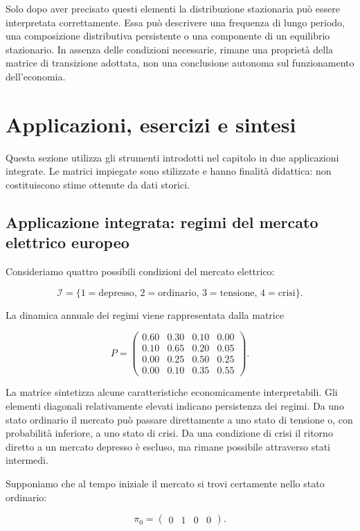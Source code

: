 Solo dopo aver precisato questi elementi la distribuzione stazionaria
pu\`{o} essere interpretata correttamente. Essa pu\`{o} descrivere una
frequenza di lungo periodo, una composizione distributiva persistente
o una componente di un equilibrio stazionario. In assenza delle
condizioni necessarie, rimane una propriet\`{a} della matrice di
transizione adottata, non una conclusione autonoma sul funzionamento
dell'economia.

\section{Applicazioni, esercizi e sintesi}

Questa sezione utilizza gli strumenti introdotti nel capitolo in due
applicazioni integrate. Le matrici impiegate sono stilizzate e hanno
finalit\`{a} didattica: non costituiscono stime ottenute da dati
storici.

\subsection{Applicazione integrata: regimi del mercato elettrico europeo}

Consideriamo quattro possibili condizioni del mercato elettrico:

\[
\mathcal{I}
=
\{
1=\text{depresso},
\,
2=\text{ordinario},
\,
3=\text{tensione},
\,
4=\text{crisi}
\}.
\]

La dinamica annuale dei regimi viene rappresentata dalla matrice

\[
P=
\begin{pmatrix}
0.60 & 0.30 & 0.10 & 0.00\\
0.10 & 0.65 & 0.20 & 0.05\\
0.00 & 0.25 & 0.50 & 0.25\\
0.00 & 0.10 & 0.35 & 0.55
\end{pmatrix}.
\]

La matrice sintetizza alcune caratteristiche economicamente
interpretabili. Gli elementi diagonali relativamente elevati indicano
persistenza dei regimi. Da uno stato ordinario il mercato pu\`{o}
passare direttamente a uno stato di tensione o, con probabilit\`{a}
inferiore, a uno stato di crisi. Da una condizione di crisi il ritorno
diretto a un mercato depresso \`{e} escluso, ma rimane possibile
attraverso stati intermedi.

Supponiamo che al tempo iniziale il mercato si trovi certamente nello
stato ordinario:

\[
\pi_0=
\begin{pmatrix}
0&1&0&0
\end{pmatrix}.
\]

